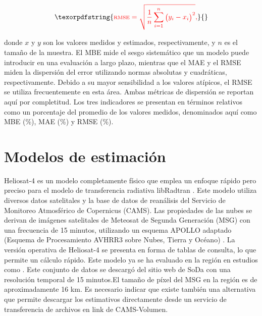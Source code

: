 \documentclass[letterpaper,12pt, twoside]{report}
\providecommand{\DIFdeltex}[1]{{\protect\color{red} \scriptsize #1}} %
\providecommand{\DIFdel}[1]{\texorpdfstring{\DIFdeltex{#1}}{}} %
\begin{document}
\begin{displaymath}
\DIFdel{\text{RMSE} = \sqrt{\frac{1}{n} \sum_{i=1}^{n} \Big({y_i - x_i}\Big)^2},
}\end{displaymath}%

\DIFdel{donde $x$ y $y$ son los valores medidos y estimados, respectivamente, y $n$ es el tamaño de la muestra. El MBE mide el sesgo sistemático que un modelo puede introducir en una evaluación a largo plazo, mientras que el MAE y el RMSE miden la dispersión del error utilizando normas absolutas y cuadráticas, respectivamente. Debido a su mayor sensibilidad a los valores atípicos, el RMSE se utiliza frecuentemente en esta área. Ambas métricas de dispersión se reportan aquí por completitud. Los tres indicadores se presentan en términos relativos como un porcentaje del promedio de los valores medidos, denominados aquí como MBE (\%), MAE (\%) y RMSE (\%).
}%

\section{\DIFdel{Modelos de estimación}}
\addtocounter{section}{-1}%

\DIFdel{Heliosat-4 \citep{qu2017} es un modelo completamente físico que emplea un enfoque rápido pero preciso para el modelo de transferencia radiativa libRadtran \citep{Mayer2005}. Este modelo utiliza diversos datos satelitales y la base de datos de reanálisis del Servicio de Monitoreo Atmosférico de Copernicus (CAMS). Las propiedades de las nubes se derivan de imágenes satelitales de Meteosat de Segunda Generación (MSG) con una frecuencia de 15 minutos, utilizando un esquema APOLLO adaptado (Esquema de Procesamiento AVHRR3 sobre Nubes, Tierra y Océano) \citep{Kriebel2003}. La versión operativa de Heliosat-4 se presenta en forma de tablas de consulta, lo que permite un cálculo rápido. Este modelo ya se ha evaluado en la región en estudios como \citep{Salazar2022, Salazar2025, Ledesma2023, Ledesma2024}. Este conjunto de datos se descargó del sitio web de SoDa con una resolución temporal de 15 minutos.El tamaño de píxel del MSG en la región es de aproximadamente 16 km. Es necesario indicar que existe también una alternativa que permite descargar los estimativos directamente desde un servicio de transferencia de archivos en link de CAMS-Volumen.}%
\end{document}
